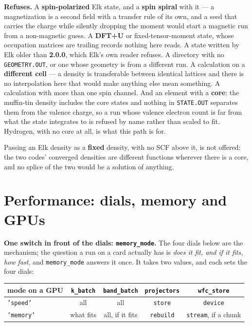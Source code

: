\documentclass[11pt,a4paper]{article}
\newcommand{\code}[1]{\texttt{\small #1}}
\begin{document}
\begin{refuses}
\textbf{Refuses.} A \textbf{spin-polarized} Elk state, and a
\textbf{spin spiral} with it --- a magnetization is a second field with a
transfer rule of its own, and a seed that carries the charge while silently
dropping the moment would start a magnetic run from a non-magnetic guess. A
\textbf{DFT+U} or fixed-tensor-moment state, whose occupation matrices are
trailing records nothing here reads. A state written by Elk older than
\textbf{2.0.0}, which Elk's own reader refuses. A directory with no
\code{GEOMETRY.OUT}, or one whose geometry is from a different run. A
calculation on a \textbf{different cell} --- a density is transferable between
identical lattices and there is no interpolation here that would make anything
else mean something. A calculation with more than one spin channel. And an
element with a \textbf{core}: the muffin-tin density includes the core states
and nothing in \code{STATE.OUT} separates them from the valence charge, so a run
whose valence electron count is far from what the state integrates to is refused
by name rather than scaled to fit. Hydrogen, with no core at all, is what this
path is for.

Passing an Elk density as a \textbf{fixed} density, with no SCF above it, is not
offered: the two codes' converged densities are different functions wherever
there is a core, and no splice of the two would be a solution of anything.
\end{refuses}

\section{Performance: dials, memory and GPUs}

\textbf{One switch in front of the dials: \code{memory\_mode}.} The four dials
below are the mechanism; the question a run on a card actually has is \emph{does
it fit, and if it fits, how fast}, and \code{memory\_mode} answers it once. It
takes two values, and each sets the four dials:

\begin{center}
\begin{tabular}{lcccc}
\toprule
mode on a GPU & \code{k\_batch} & \code{band\_batch} & \code{projectors} & \code{wfc\_store} \\
\midrule
\code{'speed'}  & all & all & \code{store}   & \code{device} \\
\code{'memory'} & what fits & all, if it fits & \code{rebuild} & \code{stream}, if a chunk \\
\bottomrule
\end{tabular}
\end{center}
\end{document}
